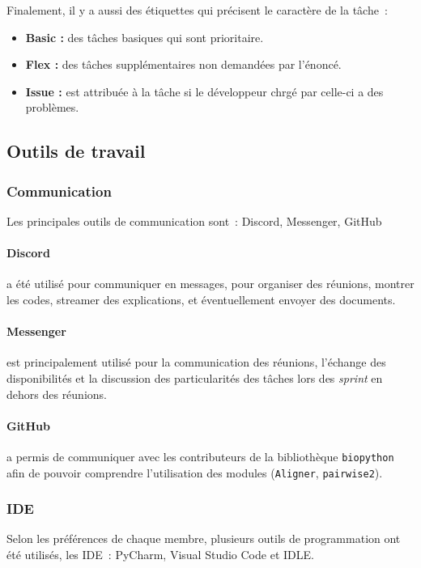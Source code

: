 \documentclass[12pt]{article}
\begin{document}
Finalement, il y a aussi des étiquettes qui précisent le caractère de la tâche~:
\begin{itemize}
    \item \textbf{Basic :} des tâches basiques qui sont prioritaire.
    \item \textbf{Flex :} des tâches supplémentaires non demandées par l'énoncé.
    \item \textbf{Issue :} est attribuée à la tâche si le développeur chrgé par celle-ci a des problèmes.
\end{itemize}



\subsection{Outils de travail}



\subsubsection{Communication}
Les principales outils de communication sont~: \textsf{Discord}, \textsf{Messenger}, \textsf{GitHub}
\paragraph{\textsf{Discord}} a été utilisé pour communiquer en messages, pour organiser des réunions, montrer les codes, streamer des explications, et éventuellement envoyer des documents.
\paragraph{\textsf{Messenger}} est principalement utilisé pour la communication des réunions, l'échange des disponibilités et la discussion des particularités des tâches lors des \textsl{sprint} en dehors des réunions.
\paragraph{\textsf{GitHub}} a permis de communiquer avec les contributeurs de la bibliothèque \texttt{biopython} afin de pouvoir comprendre l'utilisation des modules (\texttt{Aligner}, \texttt{pairwise2}).



\subsubsection{IDE}
Selon les préférences de chaque membre, plusieurs outils de programmation ont été utilisés, les IDE~: \textsf{PyCharm}, \textsf{Visual Studio Code} et \textsf{IDLE}.
\end{document}
